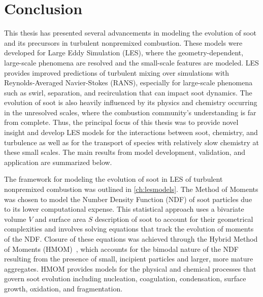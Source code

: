 \chapter{Conclusion\label{ch:conclusion}}

This thesis has presented several advancements in modeling the evolution of soot and its precursors in turbulent nonpremixed combustion. These models were developed for Large Eddy Simulation (LES), where the geometry-dependent, large-scale phenomena are resolved and the small-scale features are modeled. LES provides improved predictions of turbulent mixing over simulations with Reynolds-Averaged Navier-Stokes (RANS), especially for large-scale phenomena such as swirl, separation, and recirculation that can impact soot dynamics. The evolution of soot is also heavily influenced by its physics and chemistry occurring in the unresolved scales, where the combustion community's understanding is far from complete. Thus, the principal focus of this thesis was to provide novel insight and develop LES models for the interactions between soot, chemistry, and turbulence as well as for the transport of species with relatively slow chemistry at these small scales. The main results from model development, validation, and application are summarized below.

The framework for modeling the evolution of soot in LES of turbulent nonpremixed combustion was outlined in \cref{ch:lesmodels}. The Method of Moments was chosen to model the Number Density Function (NDF) of soot particles due to its lower computational expense. This statistical approach uses a bivariate volume $V$ and surface area $S$ description of soot to account for their geometrical complexities and involves solving equations that track the evolution of moments of the NDF. Closure of these equations was achieved through the Hybrid Method of Moments (HMOM)~\cite{hmom2009}, which accounts for the bimodal nature of the NDF resulting from the presence of small, incipient particles and larger, more mature aggregates. HMOM provides models for the physical and chemical processes that govern soot evolution including nucleation, coagulation, condensation, surface growth, oxidation, and fragmentation.

